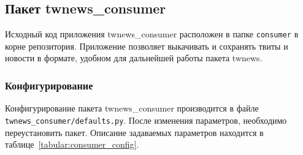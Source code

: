 \subsection{Пакет twnews\_consumer}
    Исходный код приложения twnews\_consumer расположен в папке \lstinline{consumer} в корне репозитория.
    Приложение позволяет выкачивать и сохранять твиты и новости в формате, удобном для дальнейшей работы пакета twnews.

    \subsubsection{Конфигурирование}
        Конфигурирование пакета twnews\_consumer производится в файле \lstinline{twnews_consumer/defaults.py}.
        После изменения параметров, необходимо переустановить пакет.
        Описание задаваемых параметров находится в таблице~\ref{tabular:consumer_config}.

